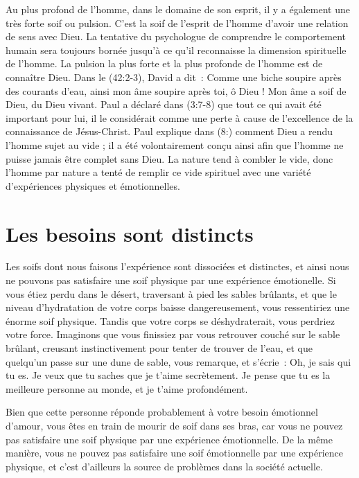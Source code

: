 Au plus profond de l'homme, dans le domaine de son esprit,
 il y a également une très forte soif ou pulsion.
 C'est la soif de l'esprit de l'homme d'avoir une relation de sens avec Dieu.
 La tentative du psychologue de comprendre le comportement humain sera toujours
 bornée jusqu'à ce qu'il reconnaisse la dimension spirituelle de l'homme.
 La pulsion la plus forte et la plus profonde de l'homme est de connaître Dieu.
 Dans le (42:2-3), David a dit~:
 \og Comme une biche soupire après des courants d'eau,
 ainsi mon âme soupire après toi, ô Dieu !
 Mon âme a soif de Dieu, du Dieu vivant. \fg{}
 Paul a déclaré dans (3:7-8) que tout ce qui avait été
 important pour lui, il le considérait comme une perte à cause
 de l'excellence de la connaissance de Jésus-Christ.
 Paul explique dans (8:) comment Dieu a rendu l'homme
 sujet au vide ; il a été volontairement conçu ainsi afin que l'homme
 ne puisse jamais être complet sans Dieu.
 La nature tend à combler le vide, donc l'homme par nature a tenté
 de remplir ce vide spirituel avec une variété d'expériences 
 physiques et émotionnelles.


\section{Les besoins sont distincts}

Les soifs dont nous faisons l'expérience sont dissociées et distinctes,
 et ainsi nous ne pouvons pas satisfaire une soif physique
 par une expérience émotionelle. Si vous étiez perdu dans le désert,
 traversant à pied les sables brûlants, et que le niveau d'hydratation
 de votre corps baisse dangereusement, vous ressentiriez une énorme soif
 physique. Tandis que votre corps se déshydraterait,
 vous perdriez votre force. Imaginons que vous finissiez par vous
 retrouver couché sur le sable brûlant, creusant instinctivement
 pour tenter de trouver de l'eau, et que quelqu'un passe sur une dune
 de sable, vous remarque, et s'écrie~:
 \og Oh, je sais qui tu es. Je veux que tu saches que je t'aime secrètement.
 Je pense que tu es la meilleure personne au monde,
 et je t'aime profondément. \fg{}


Bien que cette personne réponde probablement à votre besoin émotionnel
 d'amour, vous êtes en train de mourir de soif dans ses bras,
 car vous ne pouvez pas satisfaire une soif physique par une
 expérience émotionnelle. De la même manière, vous ne pouvez pas satisfaire une soif
 émotionnelle par une expérience physique,
 et c'est d'ailleurs la source de problèmes dans la société actuelle.


